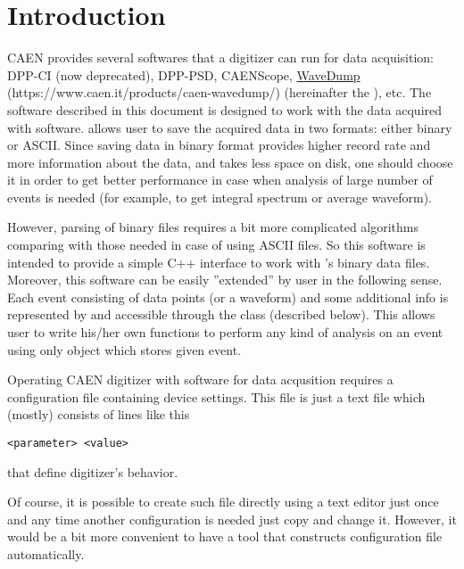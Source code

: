 \newpage
\section{Introduction}
CAEN provides several softwares that a digitizer can run for data acquisition: DPP-CI
(now deprecated), DPP-PSD, CAENScope, \href{https://www.caen.it/products/caen-wavedump/}{WaveDump} (https://www.caen.it/products/caen-wavedump/) (hereinafter the ), etc. The
software described in this document is designed to work with the data acquired with
 software.  allows user to save the acquired data in two formats: either
binary or ASCII. Since saving data in binary format provides higher record rate and
more information about the data, and takes less space on disk, one should choose it in
order to get better performance in case when analysis of large number of events is 
needed (for example, to get integral spectrum or average waveform).

However, parsing of binary files requires a bit more complicated algorithms comparing with those needed in 
case of using ASCII files. So this software is intended to provide a simple C++ interface
to work with 's binary data files. Moreover, this software can be easily ''extended''
by user in the following sense. Each event consisting of data points (or a waveform) and 
some additional info is represented by and accessible through the  class (described below).
This allows user to write his/her own functions to perform any kind of analysis on an event
using only  object which stores given event.


Operating CAEN digitizer with  software for data acqusition requires a
configuration file containing device settings. This file is just a text file which
(mostly) consists of lines like this 

\begin{lstlisting}
<parameter> <value>
\end{lstlisting}
that define digitizer's behavior.

Of course, it is possible to create such file directly using a text editor just once
and any time another configuration is needed just copy and change it. However, it would be
a bit more convenient to have a tool that constructs configuration file automatically.
